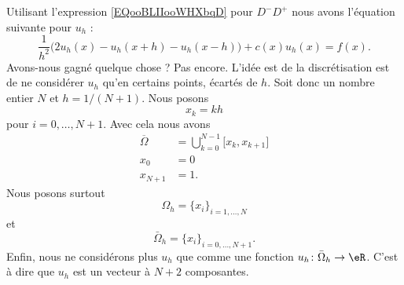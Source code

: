Utilisant l'expression \eqref{EQooBLIIooWHXbqD} pour \( D^-D^+\) nous avons l'équation suivante pour \( u_h\) :
\begin{equation}
    \frac{1}{ h^2 }\Big( 2u_h(x)-u_h(x+h)-u_h(x-h) \Big)+c(x)u_h(x)=f(x).
\end{equation}
Avons-nous gagné quelque chose ? Pas encore. L'idée est de la discrétisation est de ne considérer \( u_h\) qu'en certains points, écartés de \( h\). Soit donc un nombre entier \( N\) et \( h=1/(N+1)\). Nous posons
\begin{equation}
    x_k=kh
\end{equation}
pour \( i=0,\ldots, N+1\). Avec cela nous avons
\begin{subequations}
    \begin{align}
        \overline{ \Omega }&=\bigcup_{k=0}^{N-1}\mathopen[ x_k , x_{k+1} \mathclose]\\
        x_0&=0\\
        x_{N+1}&=1.
    \end{align}
\end{subequations}
Nous posons surtout
\begin{equation}
    \Omega_h=\{ x_i \}_{i=1,\ldots, N}
\end{equation}
et
\begin{equation}
    \bar\Omega_h=\{ x_i \}_{i=0,\ldots, N+1}.
\end{equation}
Enfin, nous ne considérons plus \( u_h\) que comme une fonction \( u_h\colon \bar\Omega_h\to \eR\). C'est à dire que \( u_h\) est un vecteur à \( N+2\) composantes.

